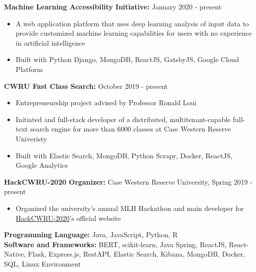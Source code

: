 \documentclass[a4paper,11pt]{article}
\begin{document}
\begin{flushleft}
	
	\textbf{Machine Learning Accessibility Initiative:} January 2020 - present
	\vspace{-\topsep}
	\begin{itemize}
		\setlength{\itemsep}{0pt plus 1pt}
		\item A web application platform that uses deep learning analysis of input data to provide customized machine learning capabilities for users with no experience in artificial intelligence
		\item Built with Python Django, MongoDB, ReactJS, GatsbyJS, Google Cloud Platform
	\end{itemize}
	
	
	\textbf{CWRU Fast Class Search:} October 2019 - present
	\vspace{-\topsep}
	\begin{itemize}
		\setlength{\itemsep}{0pt plus 1pt}
		\item Entrepreneurship project advised by Professor Ronald Loui
		\item Initiated and full-stack developer of a distributed, multitenant-capable full-text search engine for more than 6000 classes at Case Western Reserve Univeristy
		\item Built with Elastic Search, MongoDB, Python Scrapy, Docker, ReactJS, Google Analytics
	\end{itemize}
	
	

\end{flushleft}
\begin{flushleft}
	
	\textbf{HackCWRU-2020 Organizer: } Case Western Reserve University, Spring 2019 - 
	present
	\vspace{-\topsep}
	\begin{itemize}
		\setlength{\parskip}{2pt}
		\setlength{\itemsep}{0pt plus 1pt}
		\item Organized the university's annual MLH Hackathon and main developer for \href{https://hackcwru.info}{HackCWRU-2020}'s official website   \\
	\end{itemize}


	
\centering{\noindent\makebox{\rule{8cm}{1.5pt}}}
\end{flushleft} 
\begin{flushleft}
	\textbf{Programming Language:} Java, JavaScript, Python, R \\ 
	\doublespacing
	\textbf{Software and Frameworks:}  BERT, scikit-learn, Java Spring, ReactJS, React-Native, Flask, Express.js, RestAPI, Elastic Search, Kibana, MongoDB, Docker, SQL, Linux Environment\\
	\vspace{-\topsep}
	
\end{flushleft}
\end{document}

